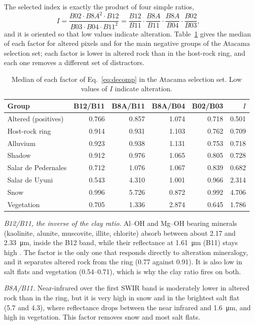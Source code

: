 \documentclass[preprint,authoryear,number]{elsarticle}
\begin{document}
The selected index is exactly the product of four simple ratios,
\begin{equation}
I = \frac{B02\cdot B8A^{2}\cdot B12}{B03\cdot B04\cdot B11^{2}} = \frac{B12}{B11}\cdot\frac{B8A}{B11}\cdot\frac{B8A}{B04}\cdot\frac{B02}{B03},
\label{eq:decomp}
\end{equation}
and it is oriented so that low values indicate alteration. Table~\ref{tab:terms} gives the median of each factor for altered pixels and for the main negative groups of the Atacama selection set; each factor is lower in altered rock than in the host-rock ring, and each one removes a different set of distractors.

\begin{table}[ht]
\centering
\caption{Median of each factor of Eq.~\ref{eq:decomp} in the Atacama selection set. Low values of $I$ indicate alteration.}
\label{tab:terms}
\begin{tabular}{lrrrrr}
\toprule
Group & B12/B11 & B8A/B11 & B8A/B04 & B02/B03 & $I$ \\
\midrule
Altered (positives) & 0.766 & 0.857 & 1.074 & 0.718 & 0.501 \\
Host-rock ring & 0.914 & 0.931 & 1.103 & 0.762 & 0.709 \\
Alluvium & 0.923 & 0.938 & 1.131 & 0.753 & 0.718 \\
Shadow & 0.912 & 0.976 & 1.065 & 0.805 & 0.728 \\
Salar de Pedernales & 0.712 & 1.076 & 1.067 & 0.839 & 0.682 \\
Salar de Uyuni & 0.543 & 4.310 & 1.001 & 0.966 & 2.314 \\
Snow & 0.996 & 5.726 & 0.872 & 0.992 & 4.706 \\
Vegetation & 0.705 & 1.336 & 2.874 & 0.645 & 1.786 \\
\bottomrule
\end{tabular}
\end{table}

\emph{B12/B11, the inverse of the clay ratio.} Al--OH and Mg--OH bearing minerals (kaolinite, alunite, muscovite, illite, chlorite) absorb between about 2.17 and \SI{2.33}{\micro\meter}, inside the B12 band, while their reflectance at \SI{1.61}{\micro\meter} (B11) stays high \citep{Hunt1977,Clark1999}. The factor is the only one that responds directly to alteration mineralogy, and it separates altered rock from the ring (0.77 against 0.91). It is also low in salt flats and vegetation (0.54--0.71), which is why the clay ratio fires on both.

\emph{B8A/B11.} Near-infrared over the first SWIR band is moderately lower in altered rock than in the ring, but it is very high in snow and in the brightest salt flat (5.7 and 4.3), where reflectance drops between the near infrared and \SI{1.6}{\micro\meter}, and high in vegetation. This factor removes snow and most salt flats.
\end{document}
